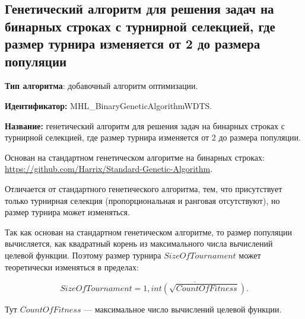 \subsection{Генетический алгоритм для решения задач на бинарных строках с турнирной селекцией, где размер турнира изменяется от 2 до размера популяции}\label{HarrixOptimizationAlgorithms:MHL_BinaryGeneticAlgorithmWDTS}

\textbf{Тип алгоритма}: добавочный алгоритм оптимизации.

\textbf{Идентификатор:} MHL\_BinaryGeneticAlgorithmWDTS.

\textbf{Название:} генетический алгоритм для решения задач на бинарных строках с турнирной селекцией, где размер турнира изменяется от 2 до размера популяции.

Основан на стандартном генетическом алгоритме на бинарных строках:  \href{https://github.com/Harrix/Standard-Genetic-Algorithm}{https://github.com/Harrix/Standard-Genetic-Algorithm}. 

Отличается от стандартного генетического алгоритма, тем, что присутствует только турнирная селекция (пропорциональная и ранговая отсутствуют), но размер турнира может изменяться.

Так как основан на стандартном генетическом алгоритме, то размер популяции вычисляется, как квадратный корень из максимального числа вычислений целевой функции. Поэтому размер турнира $SizeOfTournament$ может теоретически  изменяться в пределах:

\begin{equation}
SizeOfTournament = \overline{1,int\left( \sqrt{CountOfFitness}\right) }.
\end{equation}

Тут $CountOfFitness$ --- максимальное число вычислений целевой функции.

